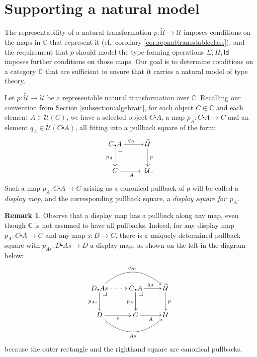 \documentclass[12pt]{article}
\makeatletter
\newcommand{\C}{\ensuremath{\mathbb{C}}}
\newcommand{\pbcorner}[1][dr]{\save*!/#1-1.2pc/#1:(-1,1)@^{|-}\restore}
\newcommand{\ext}[2]{{#1\!\centerdot\! #2}}
\newcommand{\btexdot}[2]{\ensuremath{{#1}\!\centerdot\!{#2}}}
\newcommand{\Id}{\mathsf{Id}}
\newcommand{\U}{\ensuremath{\mathcal{U}}}
\newcommand{\UU}{\ensuremath{\widetilde{\mathcal{U}}}}
\theoremstyle{definition}
\newtheorem{remark}[theorem]{Remark}
\makeatother
\begin{document}
\section{Supporting a natural model}

The representability of a natural transformation $p : \UU\to\U$ imposes conditions on the maps in $\C$ that represent it (cf.~corollary \ref{cor:repnattransstableclass}), and the requirement that $p$ should model the type-forming operations $\Sigma, \Pi, \Id$ imposes further conditions on those maps. Our goal is to determine conditions on a category $\C$ that are sufficient to  ensure that it carries a natural model of type theory.

Let $p : \UU\to\U$ be a representable natural transformation over $\C$.  Recalling our convention from Section \ref{subsection:algebraic}, for each object $C\in\C$ and each element $A\in\U(C)$, we have a selected object $\btexdot{C}{A}$, a map $p_{A}:\btexdot{C}{A} \to C$ and an element $q_A\in \UU(\btexdot{C}{A})$, all fitting into a pullback square of the form:
\begin{equation}\label{diag:prep}
\xymatrix{
\ext{C}{A} \ar[d]_{p_A} \ar[r]^{q_A} \pbcorner &  \UU \ar[d]^{p}\\
C \ar[r]_{A}   & \ \U\,.}
\end{equation}
Such a map $p_{A}:\btexdot{C}{A} \to C$ arising as a canonical pullback of $p$ will be called a \emph{display map}, and the corresponding pullback square, a \emph{display square for~$p_A$}. 

\begin{remark}\label{remark:displaypb}
Observe that a display map has a pullback along any map, even though $\C$ is not assumed to have all pullbacks.  
Indeed, for any display map $p_{A}:\btexdot{C}{A} \to C$ and any map $s : D\to C$, there is  a uniquely determined pullback square with $p_{As} : \ext{D}{As} \to D$ a display map, as shown on the left in the diagram below:
\[
\xymatrix{
\ext{D}{As} \ar@/{}^{2pc}/[rr]^{q_{As}} \ar[d]_{p_{As}} \pbcorner \ar@{.>}[r] & \ext{C}{A} \ar[d] \ar[d]_{p_A} \ar[r]^{q_A} \pbcorner &  \UU \ar[d]^{p}\\
D \ar@/{}_{2pc}/[rr]_{As} \ar[r]_{s}   & C \ar[r]_{A}   & \U}
\]
because the outer rectangle and the righthand square are canonical pullbacks.
\end{remark}
\end{document}
